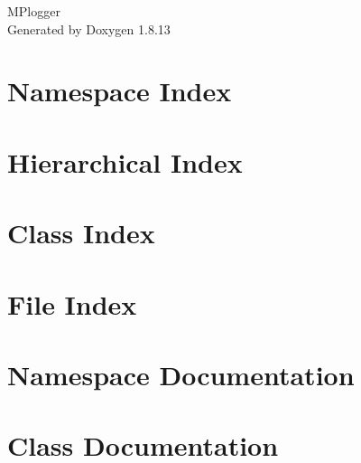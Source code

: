 \documentclass[twoside]{book}
\newcommand{\+}{\discretionary{\mbox{\scriptsize$\hookleftarrow$}}{}{}}
\newcommand{\clearemptydoublepage}{%
  \newpage{\pagestyle{empty}\cleardoublepage}%
}
\begin{document}
\hypersetup{pageanchor=false,
             bookmarksnumbered=true,
             pdfencoding=unicode
            }
\begin{titlepage}
\vspace*{7cm}
\begin{center}%
{\Large M\+Plogger }\\
\vspace*{1cm}
{\large Generated by Doxygen 1.8.13}\\
\end{center}
\end{titlepage}
\clearemptydoublepage
{}
\tableofcontents
\clearemptydoublepage
{}
\hypersetup{pageanchor=true}

\chapter{Namespace Index}

\chapter{Hierarchical Index}

\chapter{Class Index}

\chapter{File Index}

\chapter{Namespace Documentation}

\chapter{Class Documentation}
































\end{document}

